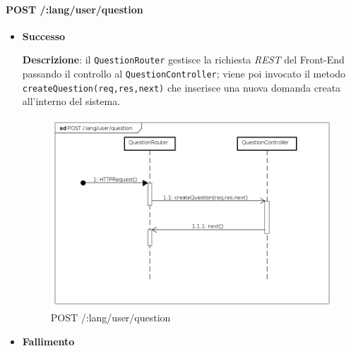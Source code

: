 \paragraph{POST /:lang/user/question}
\begin{itemize}
\item \textbf{Successo}

\textbf{Descrizione}: il \texttt{QuestionRouter} gestisce la richiesta \textit{REST} del Front-End passando il controllo al \texttt{QuestionController}; viene poi invocato il metodo\\ \texttt{createQuestion(req,res,next)} che inserisce una nuova domanda creata all'interno del sistema.

\begin{figure}[ht]
	\centering
	\includegraphics[scale=0.45]{UML/DiagrammiDiSequenza/Back-end/POST__lang_user_question.png}
	\caption{POST /:lang/user/question}
\end{figure}
\FloatBarrier

\item \textbf{Fallimento}
\end{itemize}
